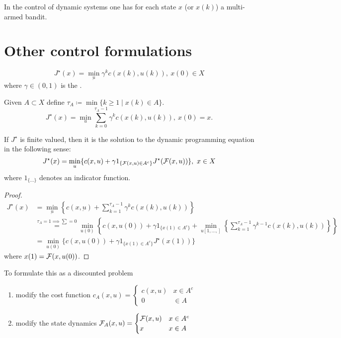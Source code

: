 In the control of dynamic systems one has for each state \(x\) (or \(x(k)\)) a 
multi-armed bandit.

\section{Other control formulations}

\[J^\star(x)=\min_{\underbar{u}}\gamma^kc(x(k),u(k)),\ x(0)\in X\]
where \(\gamma\in (0,1)\) is the .

Given \(A\subset X\) define \(\tau_A\coloneqq \min\{k\geq 1\mid x(k)\in A\}\).
\[J^\star(x)=\min_u\sum_{k=0}^{\tau_A-1}\gamma^kc(x(k),u(k)),\ x(0)=x.\]
\begin{proposition}\label{prop:1.18}
    If \(J^\star\) is finite valued, then it is the solution to 
    the dynamic programming equation in the following sense:
    \[J^\star(x)=\min_{u}\{c(x,u)+\gamma1_{\{\mathcal{F}(x,u)\in A^c\}}J^\star(\mathcal{F}(x,u))\},\ x\in X\]
    where \(1_{\{\dots\}}\) denotes an indicator function.
\end{proposition}
\begin{proof}
    \begin{align*}
        J^\star(x)&=\min_{\underbar{u}}\left\{c(x,\underbar{u})+\sum_{k=1}^{\tau_A-1}\gamma^kc(x(k),u(k))\right\}    \\
        &\stackrel{\tau_A=1\implies\sum=0}{=}\min_{u(0)}\left\{c(x,u(0))+\gamma1_{\{x(1)\in A^c\}}+\min_{u[1,\dots,]}\left\{\sum_{k=1}^{\tau_A-1}\gamma^{k-1}c(x(k),u(k))\right\}\right\}\\
        &=\min_{u(0)}\{c(x,u(0))+\gamma1_{\{x(1)\in A^c\}}J^\star(x(1))\}
    \end{align*}
    where \(x(1)=\mathcal{F}(x,u(0))\).
\end{proof}

To formulate this as a discounted problem 
\begin{enumerate}
    \item modify the cost function \(c_A(x,u)=\begin{cases}
        c(x,u) & x\in A^c \\
        0 & \in A 
    \end{cases}\)
    \item modify the state dynamics \(\mathcal{F}_A(x,u)=\begin{cases}
        \mathcal{F}(x,u) & x\in A^c \\
        x & x\in A
    \end{cases}\) 
\end{enumerate}

